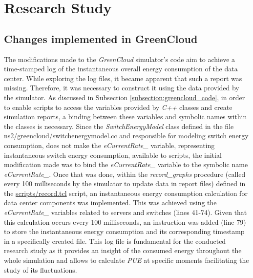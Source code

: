 \chapter{Research Study} \label{chapter:research_study}

\begin{citazione}

\end{citazione}
\newpage

\section{Changes implemented in GreenCloud}\label{section:greencloud_mod}
The modifications made to the \emph{GreenCloud} simulator's code aim to achieve a time-stamped log of the instantaneous overall energy consumption of the data center. While exploring the log files, it became apparent that such a report was missing. Therefore, it was necessary to construct it using the data provided by the simulator. As discussed in Subsection \ref{subsection:greencloud_code}, in order to enable scripts to access the variables provided by \emph{C++} classes and create simulation reports, a binding between these variables and symbolic names within the classes is necessary. Since the \emph{SwitchEnergyModel} class defined in the file \href{https://github.com/vincenzo-emanuele/masters-degree-thesis/blob/main/greencloud_modified_src/ns2/greencloud/switchenergymodel.cc}{ns2/greencloud/switchenergymodel.cc} and responsible for modeling switch energy consumption, does not make the \emph{eCurrentRate\_} variable, representing instantaneous switch energy consumption, available to scripts, the initial modification made was to bind the \emph{eCurrentRate\_} variable to the symbolic name \emph{eCurrentRate\_}. Once that was done, within the \emph{record\_graphs} procedure (called every 100 milliseconds by the simulator to update data in report files) defined in the \href{https://github.com/vincenzo-emanuele/masters-degree-thesis/blob/main/greencloud\_modified\_src/scripts/record.tcl}{scripts/record.tcl} script, an instantaneous energy consumption calculation for data center components was implemented. This was achieved using the \emph{eCurrentRate\_} variables related to servers and switches (lines 41-74). Given that this calculation occurs every 100 milliseconds, an instruction was added (line 79) to store the instantaneous energy consumption and its corresponding timestamp in a specifically created file. This log file is fundamental for the conducted research study as it provides an insight of the consumed energy throughout the whole simulation and allows to calculate \emph{PUE} at specific moments facilitating the study of its fluctuations.


